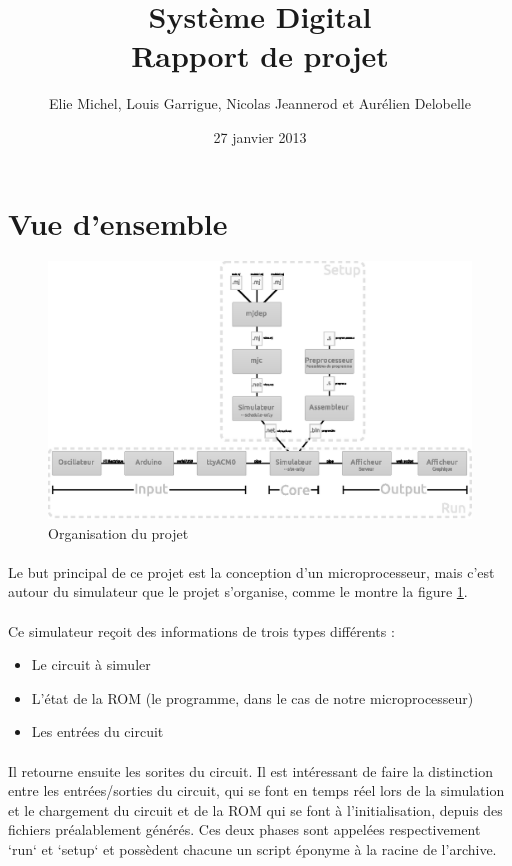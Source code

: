 \documentclass{article}
\title{Système Digital\\Rapport de projet}
\author{Elie Michel, Louis Garrigue, Nicolas Jeannerod et Aurélien Delobelle}
\date{27 janvier 2013}
\begin{document}
\maketitle

\section{Vue d'ensemble}

\begin{figure}[h]
\centering
\includegraphics{organisation.eps}
\caption{\label{orga} Organisation du projet}
\end{figure}
\paragraph{}Le but principal de ce projet est la conception d'un microprocesseur, mais c'est autour du simulateur que le projet s'organise, comme le montre la figure \ref{orga}.

\paragraph{}Ce simulateur reçoit des informations de trois types différents :
\begin{itemize}
	\item Le circuit à simuler
	\item L'état de la ROM (le programme, dans le cas de notre microprocesseur)
	\item Les entrées du circuit
\end{itemize}

\paragraph{}Il retourne ensuite les sorites du circuit. Il est intéressant de faire la distinction entre les entrées/sorties du circuit, qui se font en temps réel lors de la simulation et le chargement du circuit et de la ROM qui se font à l'initialisation, depuis des fichiers préalablement générés. Ces deux phases sont appelées respectivement `run` et `setup` et possèdent chacune un script éponyme à la racine de l'archive.
\end{document}
